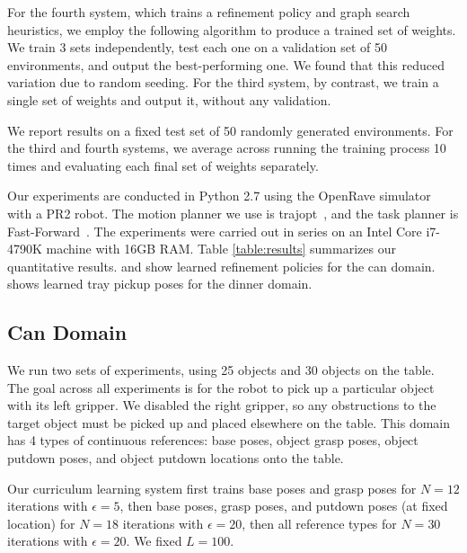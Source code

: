 For the fourth system, which trains a refinement policy and graph search heuristics, we employ the following
algorithm to produce a trained set of weights. We train 3 sets independently, test each
one on a validation set of 50 environments, and output the best-performing one. We found that this
reduced variation due to random seeding. For the third system, by contrast, we train a single
set of weights and output it, without any validation.

We report results on a fixed test set of 50 randomly generated environments.
For the third and fourth systems, we average across running the training process 10 times
and evaluating each final set of weights separately.

Our experiments are conducted in Python 2.7 using the OpenRave simulator~\cite{Diankov_2008_6117} with a PR2 robot.
The motion planner we use is trajopt~\cite{schulman2013finding}, and the task planner is Fast-Forward~\cite{FF}.
The experiments were carried out in series on an Intel Core i7-4790K machine with 16GB RAM.
Table \ref{table:results} summarizes our quantitative results.  and 
show learned refinement policies for the can domain.  shows learned tray pickup poses
for the dinner domain.

\subsection{Can Domain}
We run two sets of experiments, using 25 objects and 30 objects on the table.
The goal across all experiments is for the robot to pick up a particular object with its
left gripper. We disabled the right gripper, so any obstructions to the target object must be picked up and
placed elsewhere on the table. This domain has 4 types of continuous references: base poses, object grasp
poses, object putdown poses, and object putdown locations onto the table.

Our curriculum learning system first trains base poses and grasp poses for $N = 12$ iterations with $\epsilon = 5$,
then base poses, grasp poses, and putdown poses (at fixed location) for $N = 18$ iterations with $\epsilon = 20$,
then all reference types for $N = 30$ iterations with $\epsilon = 20$. We fixed $L = 100$.


